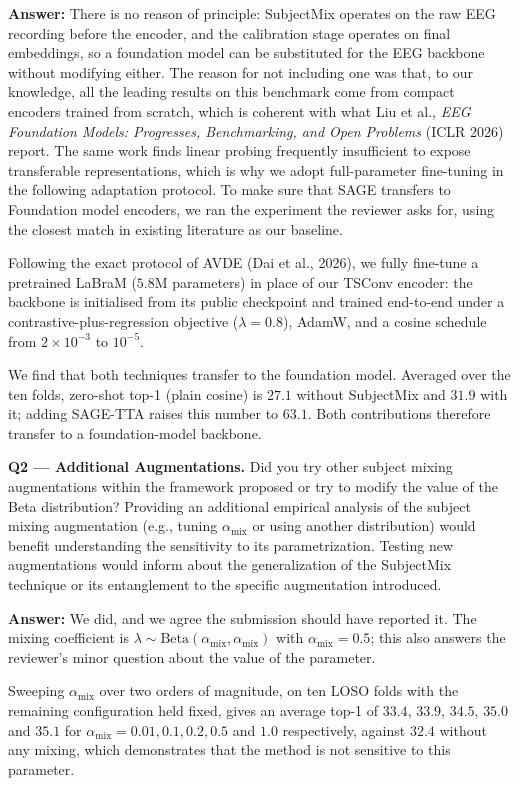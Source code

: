 \documentclass[11pt]{article}
\newcommand{\answer}[1]{{\textbf{Answer:} \color{blue} #1}}
\begin{document}
\answer{
There is no reason of principle: SubjectMix operates on the raw
EEG recording before the encoder, and the calibration stage operates on final embeddings, so a foundation model can be substituted for the EEG backbone without modifying either. The reason for not including one was that, to our knowledge, all the leading results on this benchmark come from compact encoders trained from scratch, which is coherent with what Liu et al., \emph{EEG Foundation Models: Progresses, Benchmarking, and Open Problems} (ICLR 2026) report. The same work finds linear probing frequently insufficient to expose transferable representations, which is why we adopt full-parameter fine-tuning in the following adaptation protocol. To make sure that SAGE transfers to Foundation model encoders, we ran the experiment the reviewer asks for, using the closest match in existing literature as our baseline.

Following the exact protocol of AVDE (Dai et al., 2026), we fully fine-tune a pretrained LaBraM ($5.8$M
parameters) in place of our TSConv encoder: the backbone is initialised from its public checkpoint and
trained end-to-end under a contrastive-plus-regression objective ($\lambda = 0.8$), AdamW, and a cosine
schedule from $2\times10^{-3}$ to $10^{-5}$. 

We find that both techniques transfer to the foundation model. Averaged over the ten folds, zero-shot top-1 (plain
cosine) is $27.1$ without SubjectMix and $31.9$ with it; adding SAGE-TTA raises this number to $63.1$. Both contributions therefore transfer to a foundation-model backbone.
}

\textbf{Q2 --- Additional Augmentations.} Did you try other subject mixing augmentations within the
framework proposed or try to modify the value of the Beta distribution? Providing an additional
empirical analysis of the subject mixing augmentation (e.g., tuning $\alpha_{\mathrm{mix}}$ or using
another distribution) would benefit understanding the sensitivity to its parametrization. Testing new
augmentations would inform about the generalization of the SubjectMix technique or its entanglement to
the specific augmentation introduced.

\answer{
We did, and we agree the submission should have reported it. The mixing coefficient is
$\lambda \sim \mathrm{Beta}(\alpha_{\mathrm{mix}}, \alpha_{\mathrm{mix}})$ with
$\alpha_{\mathrm{mix}} = 0.5$; this also answers the reviewer's minor question about the value of the
parameter.

Sweeping $\alpha_{\mathrm{mix}}$ over two orders of magnitude, on ten LOSO folds with the remaining
configuration held fixed, gives an average top-1 of $33.4$, $33.9$, $34.5$, $35.0$ and $35.1$ for
$\alpha_{\mathrm{mix}} = 0.01, 0.1, 0.2, 0.5$ and $1.0$ respectively, against $32.4$ without any
mixing, which demonstrates that the method is not sensitive to this parameter.

}
\end{document}
